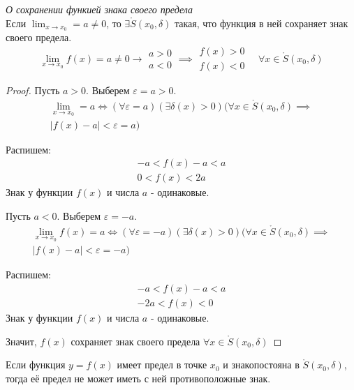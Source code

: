 \begin{theorem}
  \textit{О сохранении функией знака своего предела} \\
  Если $\lim_{x \to x_0} = a \neq 0$, то $\exists \mathring{S}(x_0, \delta)$ такая, что функция в ней сохраняет знак своего предела. \[
  \lim_{x \to x_0} f(x) = a \neq 0 \to 
  \begin{matrix}
    a > 0 \\
    a < 0
  \end{matrix}
  \implies 
  \begin{matrix}
    f(x) > 0 \\
    f(x) < 0
  \end{matrix}
  \quad
  \forall x \in \mathring{S}(x_0, \delta)
  \] 
\end{theorem}
\begin{proof}
  Пусть $a > 0$. Выберем  $\varepsilon = a > 0$.
  \begin{gather*}
    \lim_{x \to x_0} = a \iff (\forall \varepsilon = a)(\exists  \delta(x) > 0) (\forall x \in \mathring{S}(x_0, \delta) \implies \\
    |f(x)- a| < \varepsilon = a) 
  \end{gather*}

  Распишем:
  \begin{gather*}
    -a < f(x) - a < a \\
    \boxed{0 < f(x) < 2a}
  \end{gather*}
  Знак у функции $f(x)$ и числа $a$ - одинаковые.

  Пусть $a < 0$. Выберем  $\varepsilon = -a$.
  \begin{gather*}
    \lim_{x \to x_0} f(x) = a \iff (\forall \varepsilon = -a)(\exists  \delta(x) > 0) (\forall x \in \mathring{S}(x_0, \delta) \implies \\
    |f(x) - a| < \varepsilon = -a) 
  \end{gather*}

  Распишем:
  \begin{gather*}
    -a < f(x) - a < a \\
    \boxed{-2a < f(x) < 0}
  \end{gather*}
  Знак у функции $f(x)$ и числа  $a$ - одинаковые.

  Значит, $f(x)$ сохраняет знак своего предела  $\forall x \in \mathring{S}(x_0, \delta)$ 
\end{proof}

\begin{corollary}
  Если функция $y = f(x)$ имеет предел в точке  $x_0$ и знакопостояна в $\mathring{S}(x_0, \delta)$, тогда её предел не может иметь с ней противоположные знак.
\end{corollary}

